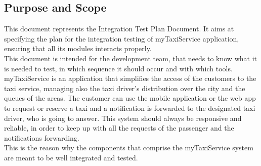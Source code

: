 \documentclass[18pt,oneside,a4paper, titlepage]{article}
\begin{document}
	\subsection{Purpose	and	Scope}
		This document represents the Integration Test Plan Document. It aims at specifying the plan for the integration testing of myTaxiService application, ensuring that all its modules interacts properly.\\
		This document is intended for the development team, that needs to know what it is needed to test, in which sequence it should occur and with which tools.\\
		myTaxiService is an application that simplifies the access of the customers to the taxi service, managing also the taxi driver's distribution over the city and the queues of the areas. The customer can use the mobile application or the web app to request or reserve a taxi and a notification is forwarded to the designated taxi driver, who is going to answer. This system should always be responsive and reliable, in order to keep up with all the requests of the passenger and the notifications forwarding.\\ This is the reason why the components that comprise the myTaxiService system are meant to be well integrated and tested.
\end{document}
